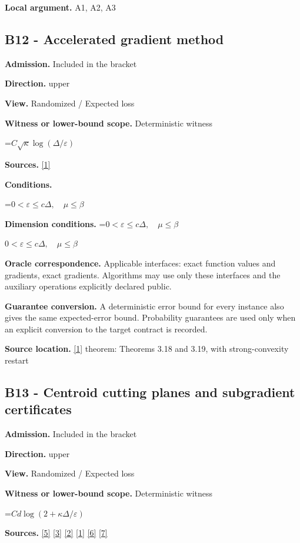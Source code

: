 \documentclass[10pt,a4paper]{article}
\newcommand{\AtlasMath}[1]{\par\begingroup\centering\setbox0=\hbox{$\displaystyle #1$}\ifdim\wd0>1.4\linewidth\typeout{ATLAS WIDE FORMULA: \the\wd0}\fi\ifdim\wd0>\linewidth\resizebox{\linewidth}{!}{\box0}\else\box0\fi\par\endgroup}
\newcommand{\AtlasInlineMath}[1]{\begingroup\setbox0=\hbox{$#1$}\ifdim\wd0>.4\linewidth\endgroup\AtlasMath{#1}\else\endgroup$#1$\fi}
\begin{document}
\textbf{Local argument.} A1, A2, A3

\subsection{B12 - Accelerated gradient method}
\textbf{Admission.} Included in the bracket

\textbf{Direction.} upper

\textbf{View.} Randomized / Expected loss

\textbf{Witness or lower-bound scope.} Deterministic witness

\AtlasMath{C\sqrt\kappa\log(\Delta/\varepsilon)}
\textbf{Sources.} \href{https://arxiv.org/pdf/1405.4980}{[1]}

\textbf{Conditions.} 
\AtlasMath{0<\varepsilon\le c\Delta,\quad\mu\le\beta}


\textbf{Dimension conditions.} \AtlasInlineMath{0<\varepsilon\le c\Delta,\quad\mu\le\beta}

\textbf{Oracle correspondence.} Applicable interfaces: exact function values and gradients, exact gradients. Algorithms may use only these interfaces and the auxiliary operations explicitly declared public.

\textbf{Guarantee conversion.} A deterministic error bound for every instance also gives the same expected-error bound. Probability guarantees are used only when an explicit conversion to the target contract is recorded.

\textbf{Source location.} \href{https://arxiv.org/pdf/1405.4980}{[1]} theorem: Theorems 3.18 and 3.19, with strong-convexity restart

\subsection{B13 - Centroid cutting planes and subgradient certificates}
\textbf{Admission.} Included in the bracket

\textbf{Direction.} upper

\textbf{View.} Randomized / Expected loss

\textbf{Witness or lower-bound scope.} Deterministic witness

\AtlasMath{C d\log(2+\kappa\Delta/\varepsilon)}
\textbf{Sources.} \href{https://arxiv.org/pdf/2101.09740v2}{[5]} \href{https://arxiv.org/pdf/2609.33360v2}{[3]} \href{https://arxiv.org/pdf/2609.10874}{[2]} \href{https://arxiv.org/pdf/1405.4980}{[1]} \href{https://www2.isye.gatech.edu/~nemirovs/MOR_AccuracyCertificates.pdf}{[6]} \href{https://arxiv.org/pdf/2609.20701}{[7]}
\end{document}
